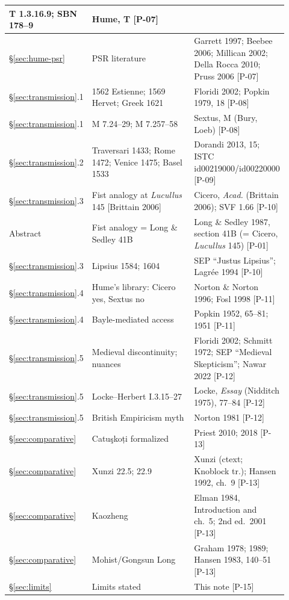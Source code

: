 \documentclass[11pt]{article}
\theoremstyle{plain}
\theoremstyle{definition}
\theoremstyle{remark}
\begin{document}
\begin{center}
\begin{longtable}{p{0.14\linewidth} p{0.46\linewidth} >{\raggedright\arraybackslash}p{0.32\linewidth}}
T 1.3.16.9; SBN 178--9 &
Hume, T [P-07] \\
\hline
\S\ref{sec:hume-psr} &
PSR literature &
Garrett 1997; Beebee 2006; Millican 2002; Della Rocca 2010; Pruss
2006 [P-07] \\
\hline
\S\ref{sec:transmission}.1 &
1562 Estienne; 1569 Hervet; Greek 1621 &
Floridi 2002; Popkin 1979, 18 [P-08] \\
\hline
\S\ref{sec:transmission}.1 &
M 7.24--29; M 7.257--58 &
Sextus, M (Bury, Loeb) [P-08] \\
\hline
\S\ref{sec:transmission}.2 &
Traversari 1433; Rome 1472; Venice 1475; Basel 1533 &
Dorandi 2013, 15; ISTC id00219000/id00220000 [P-09] \\
\hline
\S\ref{sec:transmission}.3 &
Fist analogy at \emph{Lucullus} 145 [Brittain 2006] &
Cicero, \emph{Acad.} (Brittain 2006); SVF 1.66 [P-10] \\
\hline
Abstract &
Fist analogy = Long \& Sedley 41B &
Long \& Sedley 1987, section 41B (= Cicero, \emph{Lucullus} 145)
[P-01] \\
\hline
\S\ref{sec:transmission}.3 &
Lipsius 1584; 1604 &
SEP ``Justus Lipsius''; Lagr\'ee 1994 [P-10] \\
\hline
\S\ref{sec:transmission}.4 &
Hume's library: Cicero yes, Sextus no &
Norton \& Norton 1996; Fosl 1998 [P-11] \\
\hline
\S\ref{sec:transmission}.4 &
Bayle-mediated access &
Popkin 1952, 65--81; 1951 [P-11] \\
\hline
\S\ref{sec:transmission}.5 &
Medieval discontinuity; nuances &
Floridi 2002; Schmitt 1972; SEP ``Medieval Skepticism''; Nawar 2022
[P-12] \\
\hline
\S\ref{sec:transmission}.5 &
Locke--Herbert I.3.15--27 &
Locke, \emph{Essay} (Nidditch 1975), 77--84 [P-12] \\
\hline
\S\ref{sec:transmission}.5 &
British Empiricism myth &
Norton 1981 [P-12] \\
\hline
\S\ref{sec:comparative} &
Catu\c{s}ko\d{t}i formalized &
Priest 2010; 2018 [P-13] \\
\hline
\S\ref{sec:comparative} &
Xunzi 22.5; 22.9 &
Xunzi (ctext; Knoblock tr.); Hansen 1992, ch.~9 [P-13] \\
\hline
\S\ref{sec:comparative} &
Kaozheng &
Elman 1984, Introduction and ch.~5; 2nd ed.\ 2001 [P-13] \\
\hline
\S\ref{sec:comparative} &
Mohist/Gongsun Long &
Graham 1978; 1989; Hansen 1983, 140--51 [P-13] \\
\hline
\S\ref{sec:limits} &
Limits stated &
This note [P-15] \\
\hline
\end{longtable}
\end{center}
\end{document}
